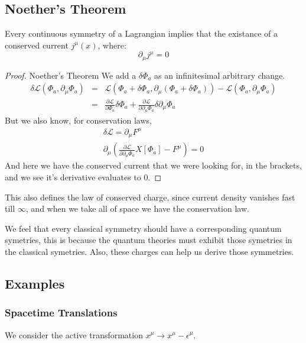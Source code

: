 \subsection{Noether's Theorem}
Every continuous symmetry of a Lagrangian implies that the existance of a conserved current $j^\mu(x)$, where:
\begin{equation}
  \partial_\mu j^\mu = 0
\end{equation}

\begin{proof}{Noether's Theorem}
  We add a $\delta \Phi_a$ as an infinitesimal arbitrary change.
  \begin{eqnarray*}
    \delta \mathcal{L}(\Phi_a, \partial_\mu \Phi_a) &=& \mathcal{L}(\Phi_a + \delta \Phi_a, \partial_\mu (\Phi_a + \delta \Phi_a)) - \mathcal{L}(\Phi_a, \partial_\mu \Phi_a) \\
    &=& \frac{\partial \mathcal{L}}{\partial \Phi_a} \delta \Phi_a + \frac{\partial \mathcal{L}}{\partial \partial_\mu \Phi_a} \delta \partial_\mu \Phi_a
  \end{eqnarray*}
  \danger
  But we also know, for conservation laws,
  \begin{eqnarray*}
    \delta \mathcal{L} = \partial_\mu F^\mu \\
    \partial_\mu (\frac{\partial \mathcal{L}}{\partial \partial_\mu \Phi_a} X[\Phi_a] - F^\mu) = 0
  \end{eqnarray*}
And here we have the conserved current that we were looking for, in the brackets, and we see it's derivative evaluates to 0.
\end{proof}

This also defines the law of conserved charge, since current density vanishes fast till $\infty$, and when we take all of space we have the conservation law.

We feel that every classical symmetry should have a corresponding quantum symetries, this is because the quantum theories must exhibit those symetries in the classical symetries. Also, these charges can help us derive those symmetries.


\subsection{Examples}

\subsubsection{Spacetime Translations}
We consider the active transformation $x^\mu \rightarrow x^\mu - \epsilon^\mu$.

